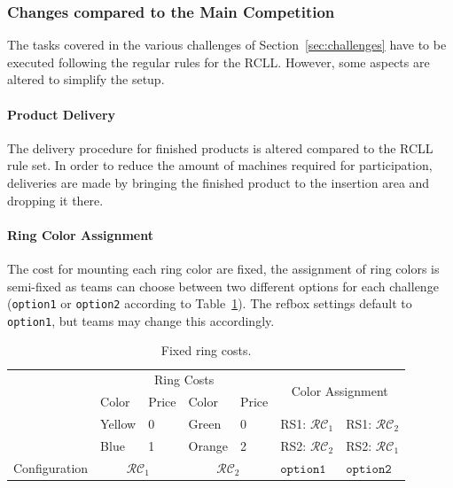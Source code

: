 \documentclass[12pt,twoside]{article}
\newcommand{\refsec}[1]{Section~\ref{#1}}
\newcommand{\reftab}[1]{Table~\ref{#1}}
\begin{document}
\subsubsection{Changes compared to the Main Competition}
The tasks covered in the various challenges of \refsec{sec:challenges} have to
be executed following the regular rules for the \ac{RCLL}.
However, some aspects are altered to simplify the setup.

\paragraph{Product Delivery}
The delivery procedure for finished products is altered compared to the
\ac{RCLL} rule set. In order to reduce the amount of machines required
for participation, deliveries are made by bringing the finished product
to the insertion area and dropping it there.

\paragraph{Ring Color Assignment}
The cost for mounting each ring color are fixed, the assignment of ring colors
is semi-fixed as teams can choose between two different options for each
challenge (\texttt{option1} or \texttt{option2} according to
\reftab{tab:ring-costs}).
The \ac{refbox} settings default to \texttt{option1}, but teams may change this
accordingly.

\newcommand{\colconfig}{\mathcal{RC}}
\begin{table}[!htb]
 \centering
 \begin{tabular}{l|l|l||l|l||l|l}
  & \multicolumn{4}{c||}{Ring Costs}
  & \multicolumn{2}{c}{\multirow{2}{*}{Color Assignment }}\\\cline{2-5}
  & Color  & Price & Color  & Price & \multicolumn{2}{c}{}\\\cline{2-7}
  & Yellow & 0 & Green & 0
  & \ac{RS}1: $\colconfig_1$ & \ac{RS}1: $\colconfig_2$ \\
  & Blue  & 1 & Orange & 2
  & \ac{RS}2: $\colconfig_2$ & \ac{RS}2: $\colconfig_1$ \\\hline\hline
  Configuration & \multicolumn{2}{c||}{$\colconfig_1$}
  & \multicolumn{2}{c||}{$\colconfig_2$}
  & $\texttt{option1}$ & $\texttt{option2}$\\
 \end{tabular}
 \caption{Fixed ring costs.}
 \label{tab:ring-costs}
\end{table}
\end{document}
